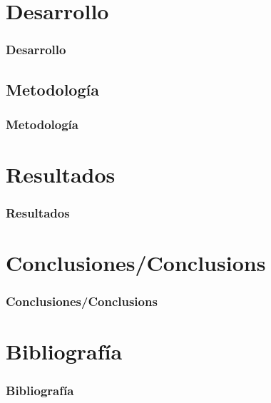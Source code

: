 \documentclass{beamer}
\begin{document}

\section{Desarrollo}
\begin{frame}
  \frametitle{Desarrollo}
\end{frame}


\subsection{Metodología}
\begin{frame}
  \frametitle{Metodología}
\end{frame}


\section{Resultados}
\begin{frame}
  \frametitle{Resultados}
\end{frame}

\section{Conclusiones/Conclusions}
\begin{frame}
  \frametitle{Conclusiones/Conclusions}
%   
\end{frame}


\section{Bibliografía}
\begin{frame}[allowframebreaks]
  \frametitle{Bibliografía}
  
  
  \nocite{*}
\end{frame}
\end{document}

